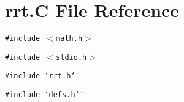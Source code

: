 \section{rrt.C File Reference}
\label{rrt_8C}
{\tt \#include $<$math.h$>$}\par
{\tt \#include $<$stdio.h$>$}\par
{\tt \#include \char`\"{}rrt.h\char`\"{}}\par
{\tt \#include \char`\"{}defs.h\char`\"{}}\par
